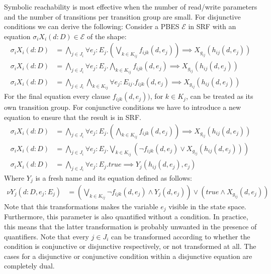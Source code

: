 \documentclass{article}
\begin{document}
Symbolic reachability is most effective when the number of read/write parameters and the number of transitions per transition group are small.
For disjunctive conditions we can derive the following:
Consider a PBES $\mathcal{E}$ in SRF with an equation $\sigma_i X_i(d:D) \in \mathcal{E}$ of the shape:
\begin{align*}
  \sigma_i X_i(d:D) &= \bigwedge\limits_{j \in J_i} \forall e_j : E_j . (\bigvee\limits_{k \in K_{ij}} f_{ijk}(d,e_j)) \implies X_{g_{ij}}(h_{ij}(d, e_j)) \\  
  \sigma_i X_i(d:D) &= \bigwedge\limits_{j \in J_i} \forall e_j : E_j . \bigwedge\limits_{k \in K_{ij}} f_{ijk}(d,e_j) \implies X_{g_{ij}}(h_{ij}(d, e_j)) \\
  \sigma_i X_i(d:D) &= \bigwedge\limits_{j \in J_i}\bigwedge\limits_{k \in K_{ij}} \forall e_j : E_{ij} .  f_{ijk}(d,e_j) \implies X_{g_{ij}}(h_{ij}(d, e_j))
\end{align*}
For the final equation every clause $f_{ijk}(d,e_j))$, for $k \in K_j$, can be treated as its own transition group.
For conjunctive conditions we have to introduce a new equation to ensure that the result is in SRF.
\begin{align*}
  \sigma_i X_i(d:D) &= \bigwedge\limits_{j \in J_i} \forall e_j : E_j . (\bigwedge\limits_{k \in K_{ij}} f_{ijk}(d,e_j)) \implies X_{g_{ij}}(h_{ij}(d, e_j)) \\  
  \sigma_i X_i(d:D) &= \bigwedge\limits_{j \in J_i} \forall e_j : E_j . \bigvee\limits_{k \in K_{ij}} (\neg f_{ijk}(d,e_j) \lor X_{g_{ij}}(h_{ij}(d, e_j))) \\
  \sigma_i X_i(d:D) &= \bigwedge\limits_{j \in J_i} \forall e_j : E_j .  \textit{true} \implies Y_j(h_{ij}(d, e_j), e_j)
\end{align*}
Where $Y_j$ is a fresh name and its equation defined as follows:
\begin{align*}
  \nu Y_j(d : D, e_j : E_j) &= (\bigvee\limits_{k \in K_{ij}} \neg f_{ijk}(d,e_j) \land Y_j(d, e_j)) \lor (\textit{true} \land X_{g_{ij}}(d, e_j))
\end{align*}
Note that this transformations makes the variable $e_j$ visible in the state space.
Furthermore, this parameter is also quantified without a condition.
In practice, this means that the latter transformation is probably unwanted in the presence of quantifiers.
Note that every $j \in J_i$ can be transformed according to whether the condition is conjunctive or disjunctive respectively, or not transformed at all.
The cases for a disjunctive or conjunctive condition within a disjunctive equation are completely dual.
\end{document}
